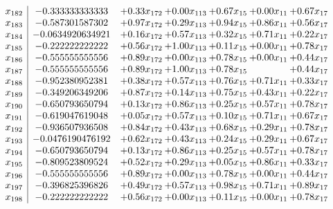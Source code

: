 \documentclass[8pt]{article}
\begin{document}
\[\begin{array}{c| c c@{\hskip 2pt} c@{\hskip 2pt} c@{\hskip 2pt} c@{\hskip 2pt} c@{\hskip 2pt} }
 x_{182}   &  -0.333333333333 & +  0.33 x_{172} & +  0.00 x_{113} & +  0.67 x_{15} & +  0.00 x_{11} & +  0.67 x_{17}\\
 x_{183}   &  -0.587301587302 & +  0.97 x_{172} & +  0.29 x_{113} & +  0.94 x_{15} & +  0.86 x_{11} & +  0.56 x_{17}\\
 x_{184}   &  -0.0634920634921 & +  0.16 x_{172} & +  0.57 x_{113} & +  0.32 x_{15} & +  0.71 x_{11} & +  0.22 x_{17}\\
 x_{185}   &  -0.222222222222 & +  0.56 x_{172} & +  1.00 x_{113} & +  0.11 x_{15} & +  0.00 x_{11} & +  0.78 x_{17}\\
 x_{186}   &  -0.555555555556 & +  0.89 x_{172} & +  0.00 x_{113} & +  0.78 x_{15} & +  0.00 x_{11} & +  0.44 x_{17}\\
 x_{187}   &  -0.555555555556 & +  0.89 x_{172} & +  1.00 x_{113} & +  0.78 x_{15} &   & +  0.44 x_{17}\\
 x_{188}   &  -0.952380952381 & +  0.38 x_{172} & +  0.57 x_{113} & +  0.76 x_{15} & +  0.71 x_{11} & +  0.33 x_{17}\\
 x_{189}   &  -0.349206349206 & +  0.87 x_{172} & +  0.14 x_{113} & +  0.75 x_{15} & +  0.43 x_{11} & +  0.22 x_{17}\\
 x_{190}   &  -0.650793650794 & +  0.13 x_{172} & +  0.86 x_{113} & +  0.25 x_{15} & +  0.57 x_{11} & +  0.78 x_{17}\\
 x_{191}   &  -0.619047619048 & +  0.05 x_{172} & +  0.57 x_{113} & +  0.10 x_{15} & +  0.71 x_{11} & +  0.67 x_{17}\\
 x_{192}   &  -0.936507936508 & +  0.84 x_{172} & +  0.43 x_{113} & +  0.68 x_{15} & +  0.29 x_{11} & +  0.78 x_{17}\\
 x_{193}   &  -0.0476190476192 & +  0.62 x_{172} & +  0.43 x_{113} & +  0.24 x_{15} & +  0.29 x_{11} & +  0.67 x_{17}\\
 x_{194}   &  -0.650793650794 & +  0.13 x_{172} & +  0.86 x_{113} & +  0.25 x_{15} & +  0.57 x_{11} & +  0.78 x_{17}\\
 x_{195}   &  -0.809523809524 & +  0.52 x_{172} & +  0.29 x_{113} & +  0.05 x_{15} & +  0.86 x_{11} & +  0.33 x_{17}\\
 x_{196}   &  -0.555555555556 & +  0.89 x_{172} & +  0.00 x_{113} & +  0.78 x_{15} & +  0.00 x_{11} & +  0.44 x_{17}\\
 x_{197}   &  -0.396825396826 & +  0.49 x_{172} & +  0.57 x_{113} & +  0.98 x_{15} & +  0.71 x_{11} & +  0.89 x_{17}\\
 x_{198}   &  -0.222222222222 & +  0.56 x_{172} & +  0.00 x_{113} & +  0.11 x_{15} & +  0.00 x_{11} & +  0.78 x_{17}\\

\end{array}\]
\end{document}
